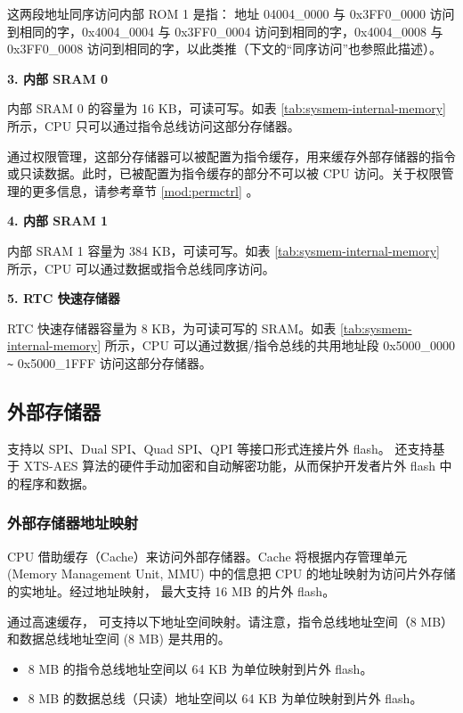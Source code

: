 \documentclass[main\_\_CN.tex]{subfiles}
\begin{document}
这两段地址同序访问内部 ROM 1 是指： 地址 04004\_0000 与 0x3FF0\_0000 访问到相同的字，0x4004\_0004 与 0x3FF0\_0004 访问到相同的字，0x4004\_0008 与 0x3FF0\_0008 访问到相同的字，以此类推（下文的“同序访问”也参照此描述）。

{\bfseries 3. 内部 SRAM 0}
\label{other:sysmem-internal-sram-0}

内部 SRAM 0 的容量为 16 KB，可读可写。如表 \ref{tab:sysmem-internal-memory} 所示，CPU 只可以通过指令总线访问这部分存储器。

通过权限管理，这部分存储器可以被配置为指令缓存，用来缓存外部存储器的指令或只读数据。此时，已被配置为指令缓存的部分不可以被 CPU 访问。关于权限管理的更多信息，请参考章节 \ref{mod:permctrl} \textit{}。


{\bfseries 4. 内部 SRAM 1}

内部 SRAM 1 容量为 384 KB，可读可写。如表 \ref{tab:sysmem-internal-memory} 所示，CPU 可以通过数据或指令总线同序访问。


{\bfseries 5. RTC 快速存储器}

RTC 快速存储器容量为 8 KB，为可读可写的 SRAM。如表 \ref{tab:sysmem-internal-memory} 所示，CPU 可以通过数据/指令总线的共用地址段 0x5000\_0000 \verb+~+ 0x5000\_1FFF 访问这部分存储器。

\subsection{外部存储器} 
\label{para:sysmem-external-memory}

\chipname{} 支持以 SPI、Dual SPI、Quad SPI、QPI 等接口形式连接片外 flash。 
\chipname{} 还支持基于 XTS-AES 算法的硬件手动加密和自动解密功能，从而保护开发者片外 flash 中的程序和数据。


\subsubsection{外部存储器地址映射}

CPU 借助缓存（Cache）来访问外部存储器。Cache 将根据内存管理单元 (Memory Management Unit, MMU) 中的信息把 CPU 的地址映射为访问片外存储的实地址。经过地址映射，\chipname{} 最大支持 16 MB 的片外 flash。 

通过高速缓存，\chipname{} 可支持以下地址空间映射。请注意，指令总线地址空间（8 MB）和数据总线地址空间 (8 MB) 是共用的。

\begin{itemize}
    \item 8 MB 的指令总线地址空间以 64 KB 为单位映射到片外 flash。
    \item 8 MB 的数据总线（只读）地址空间以 64 KB 为单位映射到片外 flash。
\end{itemize}
\end{document}
